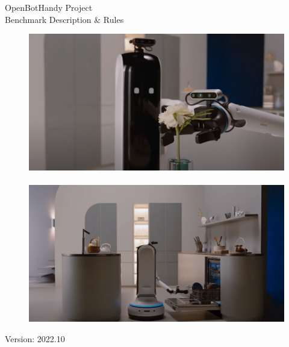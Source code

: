 
\begin{title}

\vspace{2.5 cm}
\noindent
\begin{center}
  \vspace*{.27cm}
  \Huge{OpenBotHandy Project}\\[1.23ex]
  \Large Benchmark Description \& Rules\\[2ex]
\end{center}
\vspace{2.5 cm}

\noindent
\begin{figure}[h]
\centering
\includegraphics[width=.43\textwidth]{images/bothandy.png}
~~
\includegraphics[width=.43\textwidth]{images/bothandy2.png}
\end{figure}

\vfill
\hfill Version: 2022.10 ~~
\end{title}